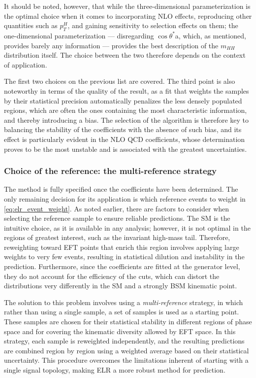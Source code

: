 It should be noted, however, that while the three-dimensional parameterization is the optimal choice when it comes to incorporating NLO effects, reproducing other quantities such as $p_T^H$, and gaining sensitivity to selection effects on them; the one-dimensional parameterization — disregarding $\cos\theta^*$a, which, as mentioned, provides barely any information — provides the best description of the $m_{HH}$ distribution itself. The choice between the two therefore depends on the context of application.

The first two choices on the previous list are covered. The third point is also noteworthy in terms of the quality of the result, as a fit that weights the samples by their statistical precision automatically penalizes the less densely populated regions, which are often the ones containing the most characteristic information, and thereby introducing a bias. The selection of the algorithm is therefore key to balancing the stability of the coefficients with the absence of such bias, and its effect is particularly evident in the NLO QCD coefficients, whose determination proves to be the most unstable and is associated with the greatest uncertainties.

\subsubsection{Choice of the reference: the multi-reference strategy}
\label{subsec:multireference}
%
The method is fully specified once the coefficients have been determined. The only remaining decision for its application is which reference events to weight in \ref{eq:elr_event_weight}. As noted earlier, there are factors to consider when selecting the reference sample to ensure reliable predictions. The SM is the intuitive choice, as it is available in any analysis; however, it is not optimal in the regions of greatest interest, such as the invariant high-mass tail. Therefore, reweighting toward EFT points that enrich this region involves applying large weights to very few events, resulting in statistical dilution and instability in the prediction. Furthermore, since the coefficients are fitted at the generator level, they do not account for the efficiency of the cuts, which can distort the distributions very differently in the SM and a strongly BSM kinematic point.

The solution to this problem involves using a \textit{multi-reference} strategy, in which rather than using a single sample, a set of samples is used as a starting point. These samples are chosen for their statistical stability in different regions of phase space and for covering the kinematic diversity allowed by EFT space. In this strategy, each sample is reweighted independently, and the resulting predictions are combined region by region using a weighted average based on their statistical uncertainty. This procedure overcomes the limitations inherent of starting with a single signal topology, making ELR a more robust method for prediction.

